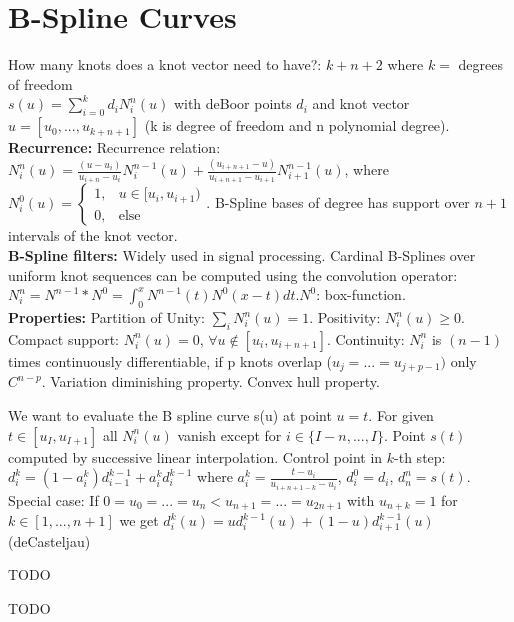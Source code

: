 \section{B-Spline Curves}
How many knots does a knot vector need to have?: $k + n + 2$ where $k = $ degrees of freedom\\
 $s(u) = \sum_{i=0}^kd_iN_i^n(u)$ with deBoor points $d_i$ and knot vector $u = [u_0, ..., u_{k+n+1}]$ (k is degree of freedom and n polynomial degree).\\ 
\textbf{Recurrence:} Recurrence relation: $N_i^n(u) = \frac{(u - u_i)}{u_{i+n} - u_i} N_i^{n-1}(u) + \frac{(u_{i+n+1} - u)}{u_{i+n+1} - u_{i+1}} N_{i+1}^{n-1}(u)$, where $N_i^0(u) = \begin{cases} 1, & u \in [u_i, u_{i+1}) \\ 0, & \text{else} \end{cases}$. B-Spline bases of degree has support over $n+1$ intervals of the knot vector.\\
\textbf{B-Spline filters:} Widely used in signal processing. Cardinal B-Splines over uniform knot sequences can be computed using the convolution operator: \( N_i^n = N^{n-1} * N^0 = \int_{0}^{x} N^{n-1}(t)N^0(x - t) dt \).\( N^0 \): box-function.\\
\textbf{Properties:} 
Partition of Unity: $\sum_i N_i^n(u) = 1$. 
Positivity: $N_i^n(u) \geq 0$.
Compact support: $N_i^n(u) = 0$, $\forall u \notin [u_i, u_{i+n+1}]$.
Continuity: $N_i^n$ is $(n-1)$ times continuously differentiable, if p knots overlap ($u_j = ... = u_{j+p-1})$ only $C^{n-p}$.
Variation diminishing property.
Convex hull property.


 We want to evaluate the B spline curve s(u) at point $u=t$. For given $t \in [u_I, u_{I+1}]$ all $N_i^n(u)$ vanish except for $i \in \{I-n, ...,I\}$. Point $s(t)$ computed by successive linear interpolation. Control point in $k$-th step: $d_i^k = (1 - a_i^k)d_{i-1}^{k-1} + a_i^k d_i^{k-1} $ where $ a_i^k = \frac{t - u_i}{u_{i+n+1-k} - u_i} $, $d_i^0 = d_i$, $d_n^n = s(t)$. Special case: If $0 = u_0 = ... = u_n < u_{n+1} = ... = u_{2n+1}$ with $u_{n+k} = 1$ for $k \in [1, ...,n+1]$ we get $d_i^k(u)=ud_i^{k-1}(u)+(1-u)d_{i+1}^{k-1}(u)$ (deCasteljau)


 TODO


 TODO